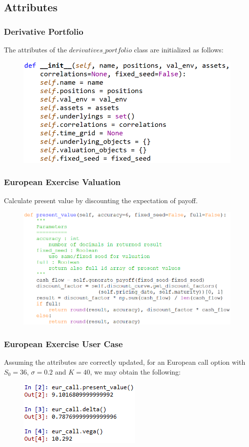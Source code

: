 \documentclass{beamer}
\begin{document}
\subsection{Attributes}
\begin{frame}
\frametitle{Derivative Portfolio}
The attributes of the $derivatives\_portfolio$ class are initialized as follows:
\begin{figure}[H]
	\includegraphics[scale=0.45]{derivatives_portfolio_attributes.png}
\end{figure}
\end{frame}

\begin{frame}
\frametitle{European Exercise Valuation}
Calculate present value by discounting the expectation of payoff.
\begin{figure}[H]
	\includegraphics[scale=0.45]{european_present_value.png}
\end{figure}
\end{frame}

\begin{frame}
\frametitle{European Exercise User Case}
Assuming the attributes are correctly updated, for an European call option with $S_{0} = 36$, $\sigma = 0.2$ and $K = 40$, we may obtain the following:
\begin{figure}[H]
	\includegraphics[scale=1.0]{european_exercise_user_case.png}
\end{figure}
\end{frame}
\end{document}
